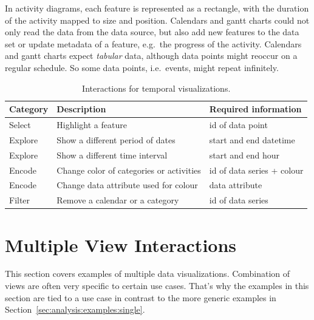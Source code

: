In activity diagrams, each feature is represented as a rectangle, with the duration of the activity mapped to size and position.
Calendars and gantt charts could not only read the data from the data source, but also add new features to the data set or update metadata of a feature, e.g.\ the progress of the activity.
Calendars and gantt charts expect \emph{tabular} data, although data points might reoccur on a regular schedule.
So some data points, i.e.\ events, might repeat infinitely.


\begin{table}
  \caption{Interactions for temporal visualizations.}%
  \label{fig:analysis:temporal:interactions}
  \begin{tabular*}{\textwidth}{lll}
    \bf Category & \bf Description & \bf Required information \\
    \hline
    Select & Highlight a feature & id of data point \\
    Explore & Show a different period of dates & start and end datetime \\
    Explore & Show a different time interval & start and end hour\\
    Encode & Change color of categories or activities & id of data series + colour \\
    Encode & Change data attribute used for colour & data attribute \\
    Filter & Remove a calendar or a category & id of data series \\
  \end{tabular*}
\end{table}

\section{Multiple View Interactions}\label{sec:analysis:examples:multiple}

This section covers examples of multiple data visualizations.
Combination of views are often very specific to certain use cases.
That's why the examples in this section are tied to a use case in contrast to the more generic examples in Section~\ref{sec:analysis:examples:single}.


